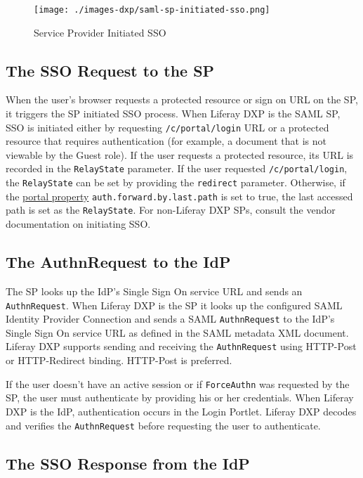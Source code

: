 \begin{figure}
\centering
\texttt{[image: ./images-dxp/saml-sp-initiated-sso.png]}
\caption{Service Provider Initiated SSO}
\end{figure}

\subsection{The SSO Request to the SP}\label{the-sso-request-to-the-sp}

When the user's browser requests a protected resource or sign on URL on
the SP, it triggers the SP initiated SSO process. When Liferay DXP is
the SAML SP, SSO is initiated either by requesting
\texttt{/c/portal/login} URL or a protected resource that requires
authentication (for example, a document that is not viewable by the
Guest role). If the user requests a protected resource, its URL is
recorded in the \texttt{RelayState} parameter. If the user requested
\texttt{/c/portal/login}, the \texttt{RelayState} can be set by
providing the \texttt{redirect} parameter. Otherwise, if the
\href{@platform-ref@/7.0-latest/propertiesdoc/portal.properties.html}{portal
property} \texttt{auth.forward.by.last.path} is set to true, the last
accessed path is set as the \texttt{RelayState}. For non-Liferay DXP
SPs, consult the vendor documentation on initiating SSO.

\subsection{The AuthnRequest to the
IdP}\label{the-authnrequest-to-the-idp}

The SP looks up the IdP's Single Sign On service URL and sends an
\texttt{AuthnRequest}. When Liferay DXP is the SP it looks up the
configured SAML Identity Provider Connection and sends a SAML
\texttt{AuthnRequest} to the IdP's Single Sign On service URL as defined
in the SAML metadata XML document. Liferay DXP supports sending and
receiving the \texttt{AuthnRequest} using HTTP-Post or HTTP-Redirect
binding. HTTP-Post is preferred.

If the user doesn't have an active session or if \texttt{ForceAuthn} was
requested by the SP, the user must authenticate by providing his or her
credentials. When Liferay DXP is the IdP, authentication occurs in the
Login Portlet. Liferay DXP decodes and verifies the \texttt{AuthnRequest}
before requesting the user to authenticate.

\subsection{The SSO Response from the
IdP}\label{the-sso-response-from-the-idp-1}

